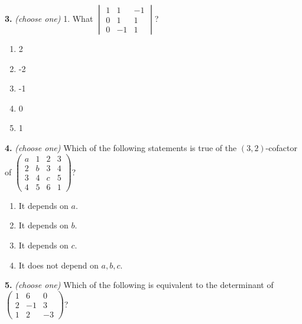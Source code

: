 \documentclass[10pt,a4paper]{article}
\begin{document}
\smallskip
\textbf{3.} \textit{(choose one)} 1.    What \(\begin{vmatrix}1&1&-1\\0&1&1\\0&-1&1\end{vmatrix}\)?

\begin{enumerate}[label=(\Alph*)]
\item 2
\item -2
\item -1
\item 0
\item 1
\end{enumerate}
\smallskip
\textbf{4.} \textit{(choose one)} Which of the following statements is true of the \((3,2)\)-cofactor of \(\begin{pmatrix}a&1&2&3\\2&b&3&4\\3&4&c&5\\4&5&6&1\end{pmatrix}\)?

\begin{enumerate}[label=(\Alph*)]
\item It depends on \(a\).
\item It depends on \(b\).
\item It depends on \(c\).
\item It does not depend on \(a,b,c\).
\end{enumerate}
\smallskip
\textbf{5.} \textit{(choose one)} Which of the following is equivalent to the determinant of \(\begin{pmatrix}1&6&0\\2&-1&3\\1&2&-3\end{pmatrix}\)?
\end{document}
